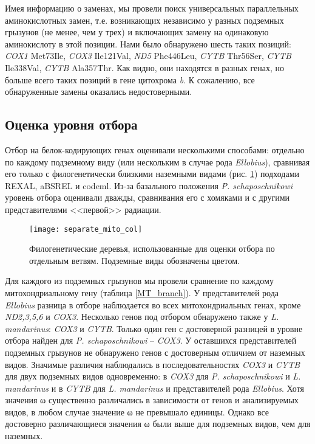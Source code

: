 Имея информацию о заменах, мы провели поиск универсальных параллельных аминокислотных замен, т.е. возникающих независимо у разных подземных грызунов (не менее, чем у трех) и включающих замену на одинаковую аминокислоту в этой позиции. Нами было обнаружено шесть таких позиций: \textit{COX1} Met73Ile, \textit{COX3} Ile121Val, \textit{ND5} Phe446Leu, \textit{CYTB} Thr56Ser, \textit{CYTB} Ile338Val, \textit{CYTB} Ala357Thr. Как видно, они находятся в разных генах, но больше всего таких позиций в гене цитохрома \textit{b}. К сожалению, все обнаруженные замены оказались недостоверными. 



\subsection{Оценка уровня отбора}

Отбор на белок-кодирующих генах оценивали несколькими способами: отдельно по каждому подземному виду (или нескольким в случае рода \textit{Ellobius}), сравнивая его только с филогенетически близкими наземными видами (рис. \ref{tree_mito}) подходами REXAL, aBSREL и codeml. Из-за базального положения \textit{P. schaposchnikowi} уровень отбора оценивали дважды, сравнивания его с хомяками и с другими представителями <<первой>> радиации.   

\begin{figure}[h!]
	\begin{center}
		\texttt{[image: separate\_mito\_col]}
	\end{center}
	\caption{Филогенетические деревья, использованные для оценки отбора по отдельным ветвям. Подземные виды обозначены цветом.}
	\label{tree_mito}
\end{figure}


Для каждого из подземных грызунов мы провели сравнение по каждому митохондриальному гену (таблица \ref{MT_branch}). У представителей рода \textit{Ellobius} разница в отборе наблюдается во всех митохондриальных генах, кроме \textit{ND2,3,5,6} и \textit{COX3}. Несколько генов под отбором обнаружено также у \textit{L. mandarinus}: \textit{COX3} и \textit{CYTB}. Только один ген с достоверной разницей в уровне отбора найден для \textit{P. schaposchnikowi} -- \textit{COX3}. У оставшихся представителей подземных грызунов не обнаружено генов с достоверным отличием от наземных видов. Значимые различия наблюдались в последовательностях \textit{COX3} и \textit{CYTB} для двух подземных видов одновременно: в \textit{COX3} для \textit{P. schaposchnikowi} и \textit{L. mandarinus} и в \textit{CYTB} для \textit{L. mandarinus} и представителей рода \textit{Ellobius}. 
Хотя значения ω существенно различались в зависимости от генов и анализируемых видов, в любом случае значение ω не превышало единицы. Однако все достоверно различающиеся значения ω были выше для подземных видов, чем для наземных. 

